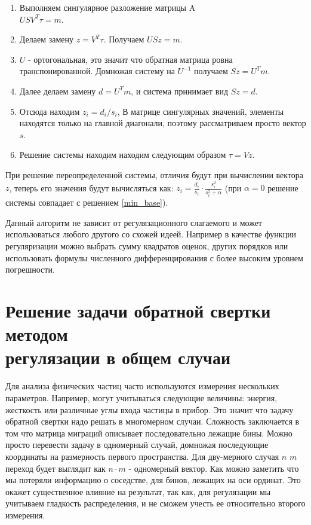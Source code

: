 \documentclass[a4paper,12pt]{diplom}
\begin{document}
\begin{enumerate}
    \item Выполняем сингулярное разложение матрицы A \\
    $USV^T \tau = m.$

    \item Делаем замену $z = V^T\tau$. Получаем $USz = m.$

    \item $U$ - ортогональная, это значит что обратная матрица ровна транспонированной. Домножая систему на $U^{-1}$ получаем $Sz=U^Tm$.

    \item Далее делаем замену $d=U^Tm$, и система принимает вид $Sz=d$.

    \item Отсюда находим $z_{i} = d_{i} / s_{i}$, В матрице сингулярных значений, элементы находятся только на главной диагонали, 
    поэтому рассматриваем просто вектор $s$.

    \item Решение системы находим находим следующим образом $\tau = Vz$.
\end{enumerate}

При решение переопределенной системы, отличия будут при вычислении вектора $z$, теперь его значения будут вычисляться как:
$z_{i} = \frac{d_{i}}{s_{i}} \cdot \frac{s^2_{i}}{s^2_{i} + \alpha}$ (при $\alpha = 0$ решение системы
совпадает с решением \eqref{min_base}).

Данный алгоритм не зависит от регулязационного слагаемого и может использоваться любого другого со схожей идеей. 
Например в качестве функции регуляризации можно выбрать сумму квадратов оценок, других порядков или использовать формулы численного 
дифференцирования с более высоким уровнем погрешности.

\section[Многомерный случай]{Решение задачи обратной свертки методом \\ регулязации в общем случаи}

Для анализа физических частиц часто используются измерения нескольких параметров. Например, могут учитываться следующие величины: 
энергия, жесткость или различные углы входа частицы в прибор. Это значит что задачу обратной свертки надо решать в многомерном 
случаи. Сложность заключается в том что матрица миграций описывает последовательно лежащие бины. Можно просто перевести задачу 
в одномерный случай, домножая последующие координаты на размерность первого пространства. Для дву-мерного случая $n$ $m$ переход 
будет выглядит как $n \cdot m$ - одномерный вектор. Как можно заметить что мы потеряли информацию о соседстве, для бинов, лежащих на
оси ординат. Это окажет существенное влияние на результат, так как, для регулязации мы учитываем гладкость распределения, и не 
сможем учесть ее относительно второго измерения.
\end{document}
